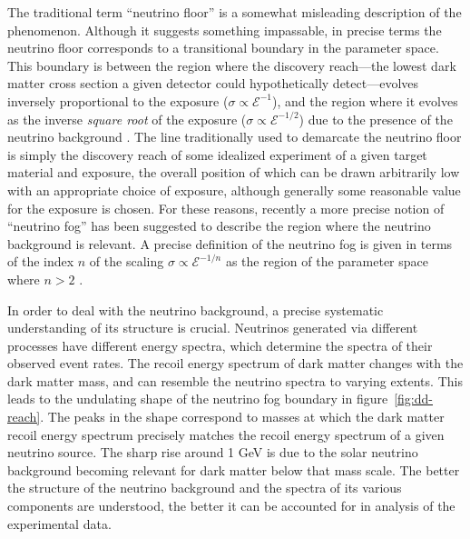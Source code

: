 The traditional term ``neutrino floor'' is a somewhat misleading description of the phenomenon. Although it suggests something impassable, in precise terms the neutrino floor corresponds to a transitional boundary in the parameter space. This boundary is between the region where the discovery reach---the lowest dark matter cross section a given detector could hypothetically detect---evolves inversely proportional to the exposure ($\sigma\propto \mathcal{E}^{-1}$), and the region where it evolves as the inverse \emph{square root} of the exposure ($\sigma\propto \mathcal{E}^{-1/2}$) due to the presence of the neutrino background \parencite{BillardFigueroaFelicianoStrigari2014}. The line traditionally used to demarcate the neutrino floor is simply the discovery reach of some idealized experiment of a given target material and exposure, the overall position of which can be drawn arbitrarily low with an appropriate choice of exposure, although generally some reasonable value for the exposure is chosen. For these reasons, recently a more precise notion of ``neutrino fog'' has been suggested to describe the region where the neutrino background is relevant. A precise definition of the neutrino fog is given in terms of the index $n$ of the scaling $\sigma\propto \mathcal{E}^{-1/n}$ as the region of the parameter space where $n>2$ \parencites{OHare2021, CarewEtAl2024}.

In order to deal with the neutrino background, a precise systematic understanding of its structure is crucial. Neutrinos generated via different processes have different energy spectra, which determine the spectra of their observed event rates. The recoil energy spectrum of dark matter changes with the dark matter mass, and can resemble the neutrino spectra to varying extents. This leads to the undulating shape of the neutrino fog boundary in figure~\ref{fig:dd-reach}. The peaks in the shape correspond to masses at which the dark matter recoil energy spectrum precisely matches the recoil energy spectrum of a given neutrino source. The sharp rise around 1 GeV is due to the solar neutrino background becoming relevant for dark matter below that mass scale. The better the structure of the neutrino background and the spectra of its various components are understood, the better it can be accounted for in analysis of the experimental data.

